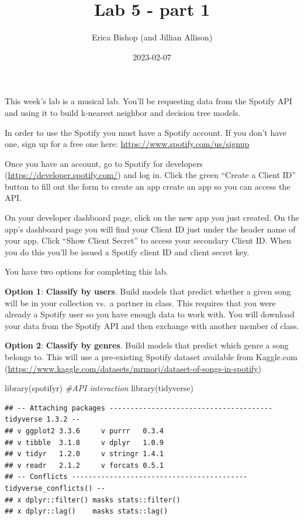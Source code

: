 \documentclass[
]{article}
\title{Lab 5 - part 1}
\author{Erica Bishop (and Jillian Allison)}
\date{2023-02-07}
\newenvironment{Shaded}{\begin{snugshade}}{\end{snugshade}}
\newcommand{\CommentTok}[1]{\textcolor[rgb]{0.56,0.35,0.01}{\textit{#1}}}
\newcommand{\FunctionTok}[1]{\textcolor[rgb]{0.00,0.00,0.00}{#1}}
\newcommand{\NormalTok}[1]{#1}
\begin{document}
\maketitle

This week's lab is a musical lab. You'll be requesting data from the
Spotify API and using it to build k-nearest neighbor and decision tree
models.

In order to use the Spotify you must have a Spotify account. If you
don't have one, sign up for a free one here:
\url{https://www.spotify.com/us/signup}

Once you have an account, go to Spotify for developers
(\url{https://developer.spotify.com/}) and log in. Click the green
``Create a Client ID'' button to fill out the form to create an app
create an app so you can access the API.

On your developer dashboard page, click on the new app you just created.
On the app's dashboard page you will find your Client ID just under the
header name of your app. Click ``Show Client Secret'' to access your
secondary Client ID. When you do this you'll be issued a Spotify client
ID and client secret key.

You have two options for completing this lab.

\textbf{Option 1}: \textbf{Classify by users}. Build models that predict
whether a given song will be in your collection vs.~a partner in class.
This requires that you were already a Spotify user so you have enough
data to work with. You will download your data from the Spotify API and
then exchange with another member of class.

\textbf{Option 2}: \textbf{Classify by genres}. Build models that
predict which genre a song belongs to. This will use a pre-existing
Spotify dataset available from Kaggle.com
(\url{https://www.kaggle.com/datasets/mrmorj/dataset-of-songs-in-spotify})

\begin{Shaded}
\begin{Highlighting}[]
\FunctionTok{library}\NormalTok{(spotifyr) }\CommentTok{\#API interaction}
\FunctionTok{library}\NormalTok{(tidyverse)}
\end{Highlighting}
\end{Shaded}

\begin{verbatim}
## -- Attaching packages --------------------------------------- tidyverse 1.3.2 --
## v ggplot2 3.3.6     v purrr   0.3.4
## v tibble  3.1.8     v dplyr   1.0.9
## v tidyr   1.2.0     v stringr 1.4.1
## v readr   2.1.2     v forcats 0.5.1
## -- Conflicts ------------------------------------------ tidyverse_conflicts() --
## x dplyr::filter() masks stats::filter()
## x dplyr::lag()    masks stats::lag()
\end{verbatim}
\end{document}
